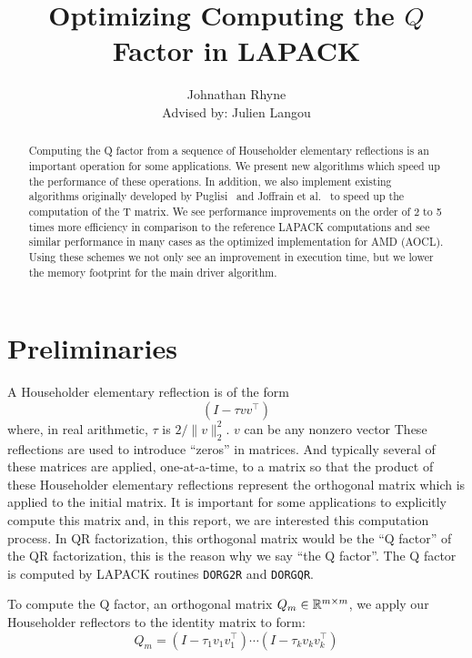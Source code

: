 \documentclass[12pt]{article}
\title{Optimizing Computing the $Q$ Factor in LAPACK}
\author{Johnathan Rhyne\\ Advised by: Julien Langou}
\begin{document}
    \maketitle
    \begin{abstract}
    Computing the Q factor from a sequence of Householder elementary reflections is an important operation for some 
    applications. We present new algorithms which speed up the performance of these operations. In addition, we also 
    implement existing algorithms originally developed by Puglisi~\cite{Puglisi} and Joffrain et al.~\cite{Joff} to speed up the computation of the T matrix. We see 
    performance improvements on the order of 2 to 5 times more efficiency in comparison to the reference LAPACK 
    computations and see similar performance in many cases as the optimized implementation for AMD (AOCL). Using these 
    schemes we not only see an improvement in execution time, but we lower the memory footprint for the main driver 
    algorithm.
    \end{abstract}


    \section{Preliminaries}
    A Householder elementary reflection is of the form
    \begin{equation}\label{eq:Q}
        \left(I - \tau vv^\top\right)
    \end{equation}
    where, in real arithmetic, $\tau$ is $2/\|v\|_2^2$. $v$ can be any nonzero vector 
    These reflections are used to introduce ``zeros'' in matrices. And typically several of these matrices are applied, one-at-a-time, 
    to a matrix so that the product of these Householder elementary reflections represent the orthogonal matrix which is applied to
    the initial matrix. It is important for some applications to explicitly compute this matrix and, in this report, we are interested
    this computation process. In QR factorization, this orthogonal matrix would be the ``Q factor'' of the QR factorization, this is the 
    reason why we say ``the Q factor''. The Q factor is computed by LAPACK routines \verb|DORG2R| and \verb|DORGQR|.

    To compute the Q factor, an orthogonal matrix $Q_m\in\mathbb{R}^{m\times m}$, we apply our Householder reflectors to the identity matrix to form:
    \begin{equation}\label{eq:Q}
        Q_m = \left(I - \tau_1 v_1v_1^\top\right)\cdots\left(I - \tau_kv_kv_k^\top\right)
    \end{equation}
\end{document}
